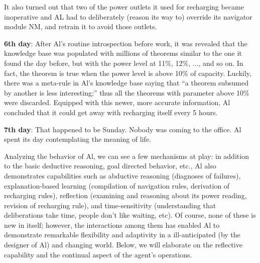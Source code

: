 \documentclass[]{llncs}
\begin{document}
It also turned out that two of the power outlets it used for recharging
became inoperative and AL had to deliberately (reason its way to) override
its navigator module NM, and retrain it to avoid those outlets.

\noindent \textbf{6th day}: After Al's routine introspection before
work, it was revealed that the knowledge base was populated with millions
of theorems similar to the one it found the day before, but with the power
level at 11\%, 12\%, ..., and so on.  In fact, the theorem is true when the
power level is above 10\% of capacity.  Luckily, there was a meta-rule in
Al's knowledge base saying that {}``a theorem subsumed by another is less
interesting;'' thus all the theorems with parameter above 10\% were
discarded.  Equipped with this newer, more accurate information, Al
concluded that it could get away with recharging itself every 5 hours.

\noindent \textbf{7th day}: That happened to be Sunday.  Nobody was
coming to the office.  Al spent its day contemplating the meaning of life.


Analyzing the behavior of Al, we can see a few mechanisms at play: in
addition to the basic deductive reasoning, goal directed behavior, etc., Al
also demonstrates capabilities such as abductive reasoning (diagnoses of
failures), explanation-based learning (compilation of navigation rules,
derivation of recharging rules), reflection (examining and reasoning about
its power reading, revision of recharging rule), and time-sensitivity
(understanding that deliberations take time, people don't like waiting,
etc).  Of course, none of these is new in itself; however, the interactions
among them has enabled Al to demonstrate remarkable flexibility and
adaptivity in a ill-anticipated (by the designer of Al) and changing world.
Below, we will elaborate on the reflective capability and the continual
aspect of the agent's operations.
\end{document}
